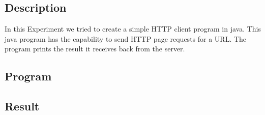 \subsection{Description}
In this Experiment we tried to create a simple HTTP client program in java.
This java program has the capability to send HTTP page requests for a URL.
The program prints the result it receives back from the server.
\subsection{Program}


\subsection{Result}\result
